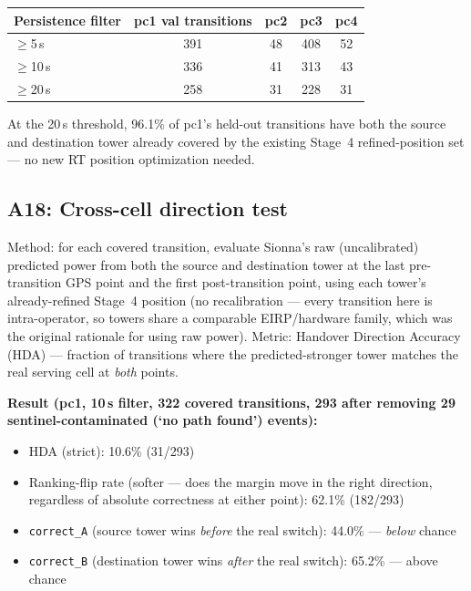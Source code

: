 \documentclass[11pt]{article}
\begin{document}
\begin{center}
\begin{tabular}{lcccc}
\toprule
Persistence filter & pc1 val transitions & pc2 & pc3 & pc4 \\
\midrule
$\geq$5\,s  & 391 & 48 & 408 & 52 \\
$\geq$10\,s & 336 & 41 & 313 & 43 \\
$\geq$20\,s & 258 & 31 & 228 & 31 \\
\bottomrule
\end{tabular}
\end{center}
At the 20\,s threshold, 96.1\% of pc1's held-out transitions have both
the source and destination tower already covered by the existing
Stage~4 refined-position set — no new RT position optimization needed.

\subsection{A18: Cross-cell direction test}
Method: for each covered transition, evaluate Sionna's raw
(uncalibrated) predicted power from both the source and destination
tower at the last pre-transition GPS point and the first post-transition
point, using each tower's already-refined Stage~4 position (no
recalibration — every transition here is intra-operator, so towers share
a comparable EIRP/hardware family, which was the original rationale for
using raw power). Metric: Handover Direction Accuracy (HDA) — fraction
of transitions where the predicted-stronger tower matches the real
serving cell at \emph{both} points.

\textbf{Result (pc1, 10\,s filter, 322 covered transitions, 293 after
removing 29 sentinel-contaminated (`no path found') events):}
\begin{itemize}
  \item HDA (strict): 10.6\% (31/293)
  \item Ranking-flip rate (softer — does the margin move in the right
        direction, regardless of absolute correctness at either point):
        62.1\% (182/293)
  \item \texttt{correct\_A} (source tower wins \emph{before} the real
        switch): 44.0\% — \emph{below} chance
  \item \texttt{correct\_B} (destination tower wins \emph{after} the real
        switch): 65.2\% — above chance
\end{itemize}
\end{document}
